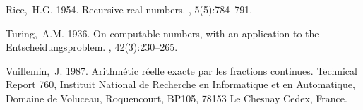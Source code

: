 \begin{thebibliography}{}
Rice,~H.G. 1954.
\newblock Recursive real numbers.
,
  5(5):784--791.

Turing,~A.M. 1936.
\newblock On computable numbers, with an application to the
  {E}ntscheidungsproblem.
, 42(3):230--265.

Vuillemin,~J. 1987.
\newblock Arithm\'{e}tic r\'{e}elle exacte par les fractions continues.
\newblock Technical Report 760, Instituit National de Recherche en Informatique
  et en Automatique, Domaine de Voluceau, Roquencourt, BP105, 78153 Le Chesnay
  Cedex, France.

\end{thebibliography}

